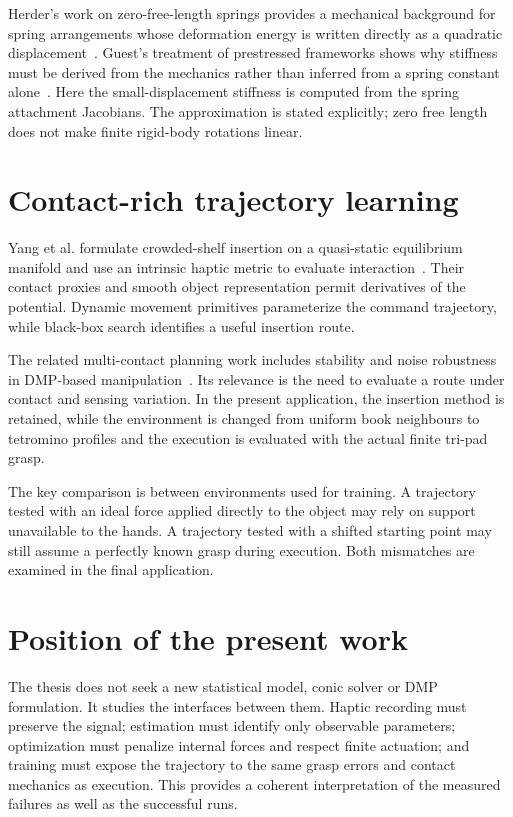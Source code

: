 Herder's work on zero-free-length springs provides a mechanical background for spring arrangements whose deformation energy is written directly as a quadratic displacement~\cite{herder2001}. Guest's treatment of prestressed frameworks shows why stiffness must be derived from the mechanics rather than inferred from a spring constant alone~\cite{guest2006}. Here the small-displacement stiffness is computed from the spring attachment Jacobians. The approximation is stated explicitly; zero free length does not make finite rigid-body rotations linear.

\section{Contact-rich trajectory learning}

Yang et al. formulate crowded-shelf insertion on a quasi-static equilibrium manifold and use an intrinsic haptic metric to evaluate interaction~\cite{yang2025haptic}. Their contact proxies and smooth object representation permit derivatives of the potential. Dynamic movement primitives parameterize the command trajectory, while black-box search identifies a useful insertion route.

The related multi-contact planning work includes stability and noise robustness in DMP-based manipulation~\cite{yang2025multicontact}. Its relevance is the need to evaluate a route under contact and sensing variation. In the present application, the insertion method is retained, while the environment is changed from uniform book neighbours to tetromino profiles and the execution is evaluated with the actual finite tri-pad grasp.

The key comparison is between environments used for training. A trajectory tested with an ideal force applied directly to the object may rely on support unavailable to the hands. A trajectory tested with a shifted starting point may still assume a perfectly known grasp during execution. Both mismatches are examined in the final application.

\section{Position of the present work}

The thesis does not seek a new statistical model, conic solver or DMP formulation. It studies the interfaces between them. Haptic recording must preserve the signal; estimation must identify only observable parameters; optimization must penalize internal forces and respect finite actuation; and training must expose the trajectory to the same grasp errors and contact mechanics as execution. This provides a coherent interpretation of the measured failures as well as the successful runs.


